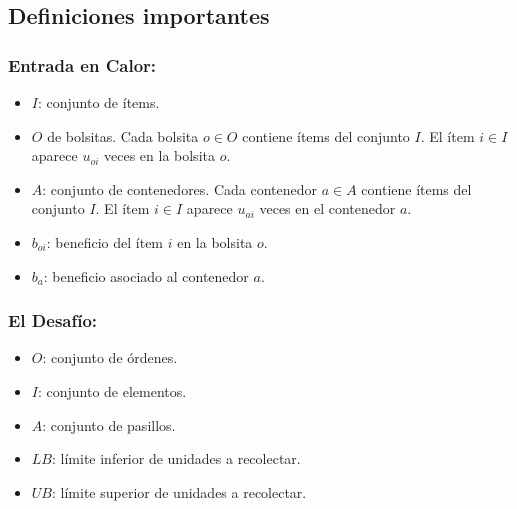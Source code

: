 \documentclass[a4paper,12pt]{article}
\begin{document}
\subsection*{Definiciones importantes}

\subsubsection*{Entrada en Calor:}

\begin{itemize}
    \item $I$: conjunto de ítems.
    \item $O$ de bolsitas. Cada bolsita $o \in O$ contiene ítems del conjunto $I$. El ítem $i \in I$ aparece $u_{oi}$ veces en la bolsita $o$.
    \item $A$: conjunto de contenedores. Cada contenedor $a \in A$ contiene ítems del conjunto $I$. El ítem $i \in I$ aparece $u_{ai}$ veces en el contenedor $a$.
    \item $b_{oi}$: beneficio del ítem $i$ en la bolsita $o$.
    \item $b_a$: beneficio asociado al contenedor $a$.
    
\end{itemize}

\subsubsection*{El Desafío:}

\begin{itemize}
    \item $O$: conjunto de órdenes.
    \item $I$: conjunto de elementos.
    \item $A$: conjunto de pasillos.
    \item $LB$: límite inferior de unidades a recolectar.
    \item $UB$: límite superior de unidades a recolectar.
\end{itemize}



\end{document}
